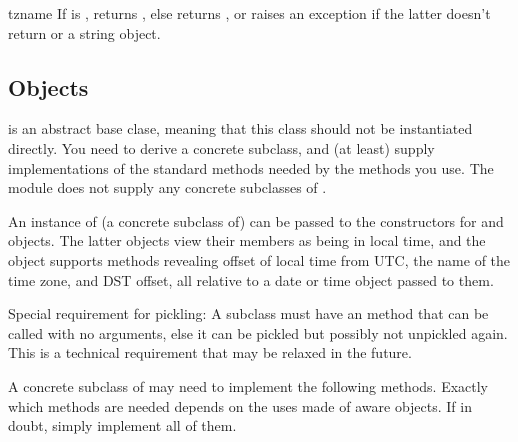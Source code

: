 \begin{methoddesc}{tzname}{}
  If  is , returns , else
  returns , or
  raises an exception if the latter doesn't return  or
  a string object.
\end{methoddesc}


\subsection{ Objects \label{datetime-tzinfo}}

 is an abstract base clase, meaning that this class
should not be instantiated directly.  You need to derive a concrete
subclass, and (at least) supply implementations of the standard
 methods needed by the  methods you
use.  The  module does not supply any concrete
subclasses of .

An instance of (a concrete subclass of)  can be passed
to the constructors for  and  objects.
The latter objects view their members as being in local time, and the
 object supports methods revealing offset of local time
from UTC, the name of the time zone, and DST offset, all relative to a
date or time object passed to them.

Special requirement for pickling:  A  subclass must have an
 method that can be called with no arguments, else it
can be pickled but possibly not unpickled again.  This is a technical
requirement that may be relaxed in the future.

A concrete subclass of  may need to implement the
following methods.  Exactly which methods are needed depends on the
uses made of aware  objects.  If in doubt, simply
implement all of them.

